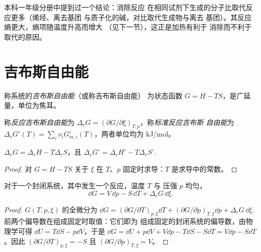 本科一年级分册中提到过一个结论：消除反应
在相同试剂下生成的分子比取代反应更多（烯烃、离去基团
与质子化的碱，对比取代生成物与离去
基团）。其反应熵更大，熵项随温度升高而增大
（见下一节），这正是加热有利于
消除而不利于取代的原因。

\section{吉布斯自由能}

\begin{definition}[吉布斯自由能]\label{def:b2:reaction-free-energy:gibbs-energy}
称系统的\emph{吉布斯自由能}（或称吉布斯自由能）
为状态函数 $G = H - TS$，是广延量，单位为焦耳。
\end{definition}

\begin{definition}[反应吉布斯自由能]\label{def:b2:reaction-free-energy:reaction-gibbs}
称\emph{反应吉布斯自由能}为 $\Delta_r G
= (\partial G/\partial\xi)_{T,p}$，称\emph{标准反应吉布斯
自由能}为 $\Delta_r G^\circ(T) =
\sum_i\nu_iG^\circ_{m,i}(T)$，两者单位均为 \unit{kJ/mol}。
\end{definition}

\begin{proposition}[焓项与熵项]\label{prop:b2:reaction-free-energy:g-h-s}
$\Delta_r G = \Delta_r H - T\Delta_r S$，且 $\Delta_r G^\circ = \Delta_r
H^\circ - T\Delta_r S^\circ$.
\end{proposition}

\begin{proof}
对 $G = H - TS$ 关于 $\xi$ 在 $T$、$p$ 固定时求导：$T$
是求导中的常数。
\end{proof}

\begin{proposition}\label{prop:b2:reaction-free-energy:dG}
对于一个封闭系统，其中发生一个反应，温度 $T$ 与
压强 $p$ 均匀，
\[
  \dd G = V\,\dd p - S\,\dd T + \Delta_r G\,\dd\xi .
\]
\end{proposition}

\begin{proof}
$G(T, p, \xi)$ 的全微分为 $\dd G = (\partial G/\partial
T)_{p,\xi}\dd T + (\partial G/\partial p)_{T,\xi}\dd p + \Delta_r G\,\dd\xi$.
前两个偏导数在组成固定时取值：它们即为
组成固定的封闭系统的偏导数，由物理学可得
$\dd U = T\dd S - p\dd V$，于是 $\dd G = \dd U + p\dd V + V\dd p - T\dd S
- S\dd T = V\dd p - S\dd T$。因此 $(\partial G/\partial T)_{p,\xi} = -S$
且 $(\partial G/\partial p)_{T,\xi} = V$。
\end{proof}

